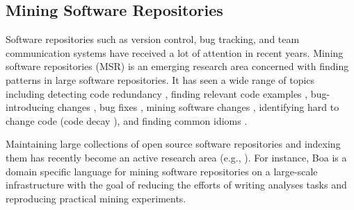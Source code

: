 \subsection{Mining Software Repositories}
Software repositories such as version control, bug tracking, and team communication systems have received a lot of attention in recent years.
Mining software repositories (MSR) is an emerging research area concerned with finding patterns in large software repositories.
It has seen a wide range of topics including detecting code redundancy \cite{Kawrykow_2009_ASE,Carzaniga_2015_ICSE}, finding relevant code examples \cite{Holmes_2005_ICSE,Sahavechaphan_2006_OOPSLA,Mandelin_2005_PLDI,Stylos_2006_VLHCC}, bug-introducing changes \cite{Sunghun_ASE_2006}, bug fixes \cite{Kim_2006_FSE,Osman_CSMR-WCRE_2014}, mining software changes \cite{Zimmermann_2005_SE,Ray_2015_MSR}, identifying hard to change code (code decay \cite{Eick_2001_SETransaction}), and finding common idioms \cite{fast_2014_CHI}.

Maintaining large collections of open source software repositories and indexing them has recently become an active research area (e.g., \cite{bajracharya_2006_OOPSLA,Caneill_2014_ESEM,Lee_2010_FSE,Stolee_2014_TOSEM}).
For instance, Boa \cite{Dyer_2013_ICSE} is a domain specific language for mining software repositories on a large-scale infrastructure with the goal of reducing the efforts of writing analyses tasks and reproducing practical mining experiments.
